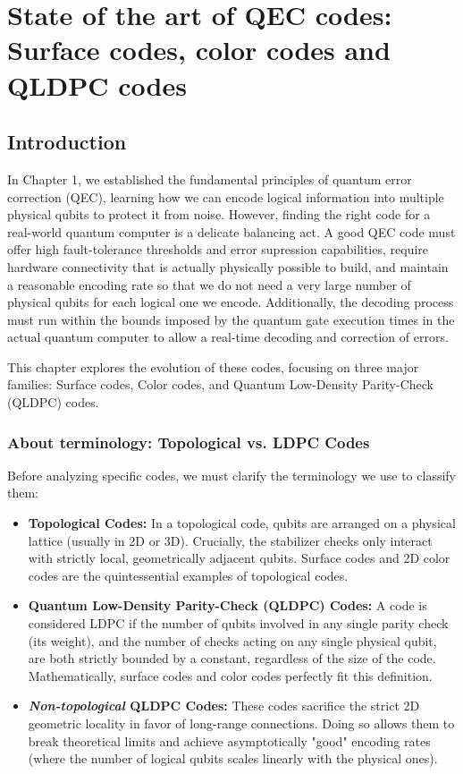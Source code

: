 \chapter{State of the art of QEC codes: Surface codes, color codes and QLDPC codes}
\label{chap:state_of_the_art}

\section{Introduction}
In Chapter 1, we established the fundamental principles of quantum error correction (QEC), learning how we can encode logical information into multiple physical qubits to protect it from noise. However, finding the right code for a real-world quantum computer is a delicate balancing act. A good QEC code must offer high fault-tolerance thresholds and error supression capabilities, require hardware connectivity that is actually physically possible to build, and maintain a reasonable encoding rate so that we do not need a very large number of physical qubits for each logical one we encode. Additionally, the decoding process must run within the bounds imposed by the quantum gate execution times in the actual quantum computer to allow a real-time decoding and correction of errors.

This chapter explores the evolution of these codes, focusing on three major families: Surface codes, Color codes, and Quantum Low-Density Parity-Check (QLDPC) codes.

\subsection{About terminology: Topological vs. LDPC Codes}
 Before analyzing specific codes, we must clarify the terminology we use to classify them:
\begin{itemize}
    \item \textbf{Topological Codes:} In a topological code, qubits are arranged on a physical lattice (usually in 2D or 3D). Crucially, the stabilizer checks only interact with strictly local, geometrically adjacent qubits. Surface codes and 2D color codes are the quintessential examples of topological codes.
    \item \textbf{Quantum Low-Density Parity-Check (QLDPC) Codes:} A code is considered LDPC if the number of qubits involved in any single parity check (its weight), and the number of checks acting on any single physical qubit, are both strictly bounded by a constant, regardless of the size of the code. Mathematically, surface codes and color codes perfectly fit this definition.
    \item \textbf{\textit{Non-topological} QLDPC Codes:} These codes sacrifice the strict 2D geometric locality in favor of long-range connections. Doing so allows them to break theoretical limits and achieve asymptotically "good" encoding rates (where the number of logical qubits scales linearly with the physical ones).
\end{itemize}

